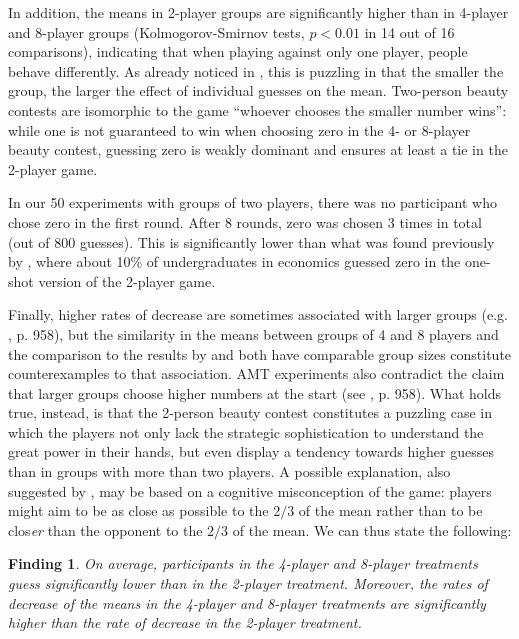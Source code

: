 \documentclass[12pt,review]{elsarticle}
\newtheorem{fdn}{Finding}
\begin{document}
In addition, the means in 2-player groups are significantly higher than in 4-player and 8-player groups (Kolmogorov-Smirnov tests, $p<0.01$ in 14 out of 16 comparisons), indicating that when playing against
only one player, people behave differently. As already noticed in \citet{HoCamererWeigelt98}, this is puzzling in that the smaller the group, the larger the effect of individual guesses on the mean. Two-person beauty contests are isomorphic to the game \textquotedblleft whoever chooses the smaller number wins\textquotedblright : while one is not
guaranteed to win when choosing zero in the 4- or 8-player beauty contest, guessing zero is weakly dominant and ensures at least a tie in the 2-player game. 

In our 50 experiments with groups of two players, there was no participant who chose zero in the first round. After
8 rounds, zero was chosen 3 times in total (out of 800 guesses). This is significantly lower than what was found previously by \citet{NagelGrosskopf2008}, where about 10\% of undergraduates in economics guessed zero in the one-shot version of the 2-player game.

Finally, higher rates of decrease are sometimes associated with larger groups (e.g. \citet{HoCamererWeigelt98}, p. 958), but the similarity in the means between groups of 4 and 8 players and the comparison to the results by \citet{ Kamm2008unter} and \citet{weber2003learning} both have comparable group sizes constitute counterexamples to that association. AMT experiments also contradict the claim that larger groups choose higher numbers at the start (see \citet{HoCamererWeigelt98}, p. 958). What holds true, instead, is that the 2-person beauty contest constitutes a puzzling case in which the players not only lack the strategic sophistication to understand the great power in their hands, but even display a tendency towards higher guesses than in groups with more than two players. A possible explanation, also suggested by \citet{NagelGrosskopf2008}, may be based on a cognitive misconception of the game: players might aim to be as close as possible to the $2/3$ of the mean rather than to be clos\emph{er} than the opponent to the $2/3$ of the mean. We can thus state the following:

\begin{fdn}
On average, participants in the 4-player and 8-player treatments guess significantly lower than in the 2-player treatment. Moreover, the rates of decrease of the means in the 4-player and 8-player treatments are significantly higher than the rate of decrease in the 2-player treatment.
\end{fdn}
\end{document}
